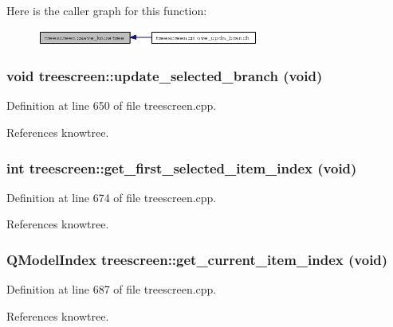Here is the caller graph for this function:\begin{figure}[H]
\begin{center}
\leavevmode
\includegraphics[width=206pt]{classtreescreen_5ecf27898d34e891ee560e25d28e8ffa_icgraph}
\end{center}
\end{figure}
\subsubsection{\setlength{\rightskip}{0pt plus 5cm}void treescreen::update\_\-selected\_\-branch (void)}\label{classtreescreen_acc87cede1cb206189394835bda06d3e}




Definition at line 650 of file treescreen.cpp.

References knowtree.
\subsubsection{\setlength{\rightskip}{0pt plus 5cm}int treescreen::get\_\-first\_\-selected\_\-item\_\-index (void)}\label{classtreescreen_c6214468c6db4e7aeada7a38ad51e727}




Definition at line 674 of file treescreen.cpp.

References knowtree.
\subsubsection{\setlength{\rightskip}{0pt plus 5cm}QModel\-Index treescreen::get\_\-current\_\-item\_\-index (void)}\label{classtreescreen_8b56108409028dc2c0996ac573fa7ff9}




Definition at line 687 of file treescreen.cpp.

References knowtree.

